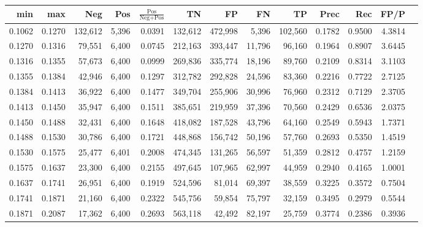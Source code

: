 \begin{tabular}{rrrrrrrrrrrrr}
\toprule
   min &    max &     Neg &   Pos & $\frac{\text{Pos}}{\text{Neg}+\text{Pos}}$ &      TN &      FP &      FN &      TP &   Prec &    Rec &   FP/P \\
\midrule
0.1062 & 0.1270 & 132,612 & 5,396 &                                     0.0391 & 132,612 & 472,998 &   5,396 & 102,560 & 0.1782 & 0.9500 & 4.3814 \\
0.1270 & 0.1316 &  79,551 & 6,400 &                                     0.0745 & 212,163 & 393,447 &  11,796 &  96,160 & 0.1964 & 0.8907 & 3.6445 \\
0.1316 & 0.1355 &  57,673 & 6,400 &                                     0.0999 & 269,836 & 335,774 &  18,196 &  89,760 & 0.2109 & 0.8314 & 3.1103 \\
0.1355 & 0.1384 &  42,946 & 6,400 &                                     0.1297 & 312,782 & 292,828 &  24,596 &  83,360 & 0.2216 & 0.7722 & 2.7125 \\
0.1384 & 0.1413 &  36,922 & 6,400 &                                     0.1477 & 349,704 & 255,906 &  30,996 &  76,960 & 0.2312 & 0.7129 & 2.3705 \\
0.1413 & 0.1450 &  35,947 & 6,400 &                                     0.1511 & 385,651 & 219,959 &  37,396 &  70,560 & 0.2429 & 0.6536 & 2.0375 \\
0.1450 & 0.1488 &  32,431 & 6,400 &                                     0.1648 & 418,082 & 187,528 &  43,796 &  64,160 & 0.2549 & 0.5943 & 1.7371 \\
0.1488 & 0.1530 &  30,786 & 6,400 &                                     0.1721 & 448,868 & 156,742 &  50,196 &  57,760 & 0.2693 & 0.5350 & 1.4519 \\
0.1530 & 0.1575 &  25,477 & 6,401 &                                     0.2008 & 474,345 & 131,265 &  56,597 &  51,359 & 0.2812 & 0.4757 & 1.2159 \\
0.1575 & 0.1637 &  23,300 & 6,400 &                                     0.2155 & 497,645 & 107,965 &  62,997 &  44,959 & 0.2940 & 0.4165 & 1.0001 \\
0.1637 & 0.1741 &  26,951 & 6,400 &                                     0.1919 & 524,596 &  81,014 &  69,397 &  38,559 & 0.3225 & 0.3572 & 0.7504 \\
0.1741 & 0.1871 &  21,160 & 6,400 &                                     0.2322 & 545,756 &  59,854 &  75,797 &  32,159 & 0.3495 & 0.2979 & 0.5544 \\
0.1871 & 0.2087 &  17,362 & 6,400 &                                     0.2693 & 563,118 &  42,492 &  82,197 &  25,759 & 0.3774 & 0.2386 & 0.3936 \\

\end{tabular}

